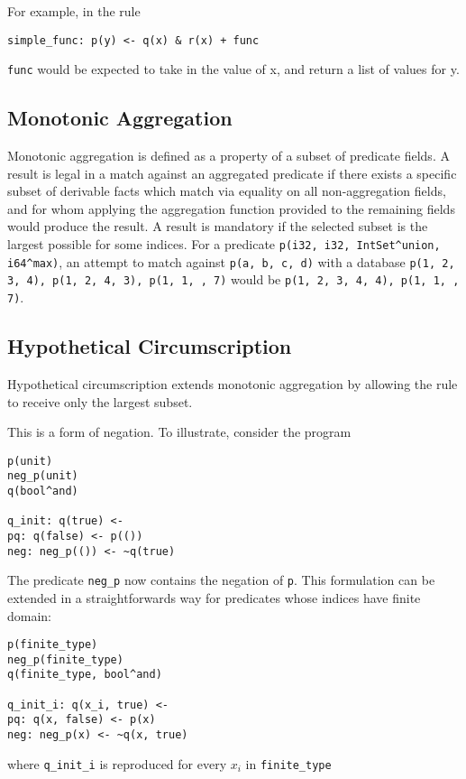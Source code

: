 For example, in the rule
\begin{verbatim}
simple_func: p(y) <- q(x) & r(x) + func
\end{verbatim}
\texttt{func} would be expected to take in the value of x, and return a list of values for y.

\subsection{Monotonic Aggregation}
Monotonic aggregation is defined as a property of a subset of predicate fields.
A result is legal in a match against an aggregated predicate if there exists a specific subset of derivable facts which match via equality on all non-aggregation fields, and for whom applying the aggregation function provided to the remaining fields would produce the result.
A result is mandatory if the selected subset is the largest possible for some indices.
For a predicate \texttt{p(i32, i32, IntSet\^{}union, i64\^{}max)}, an attempt to match against \texttt{p(a, b, c, d)} with a database \texttt{p(1, 2, {3}, 4), p(1, 2, {4}, 3), p(1, 1, {}, 7)} would be \texttt{p(1, 2, {3, 4}, 4), p(1, 1, {}, 7)}.

\subsection{Hypothetical Circumscription}
\label{sec:inf-circ}
Hypothetical circumscription extends monotonic aggregation by allowing the rule to receive only the largest subset.

This is a form of negation.
To illustrate, consider the program
\begin{verbatim}
p(unit)
neg_p(unit)
q(bool^and)

q_init: q(true) <-
pq: q(false) <- p(())
neg: neg_p(()) <- ~q(true)
\end{verbatim}

The predicate \texttt{neg_p} now contains the negation of \texttt{p}.
This formulation can be extended in a straightforwards way for predicates whose indices have finite domain:

\begin{verbatim}
p(finite_type)
neg_p(finite_type)
q(finite_type, bool^and)

q_init_i: q(x_i, true) <- 
pq: q(x, false) <- p(x)
neg: neg_p(x) <- ~q(x, true)
\end{verbatim}
where \texttt{q_init_i} is reproduced for every $x_i$ in \texttt{finite_type}

